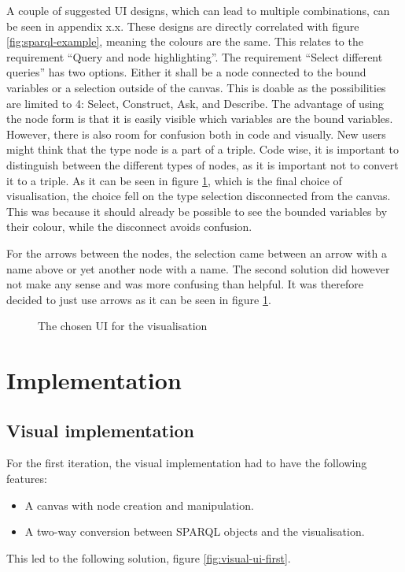 \bigskip
A couple of suggested UI designs, which can lead to multiple combinations, can be seen in appendix {\color{red}x.x}. These designs are directly correlated with figure \ref{fig:sparql-example}, meaning the colours are the same. This relates to the requirement “Query and node highlighting”. The requirement “Select different queries” has two options. Either it shall be a node connected to the bound variables or a selection outside of the canvas. This is doable as the possibilities are limited to 4: Select, Construct, Ask, and Describe. The advantage of using the node form is that it is easily visible which variables are the bound variables. However, there is also room for confusion both in code and visually. New users might think that the type node is a part of a triple. Code wise, it is important to distinguish between the different types of nodes, as it is important not to convert it to a triple. As it can be seen in figure \ref{fig:chosen-ui}, which is the final choice of visualisation, the choice fell on the type selection disconnected from the canvas. This was because it should already be possible to see the bounded variables by their colour, while the disconnect avoids confusion.

For the arrows between the nodes, the selection came between an arrow with a name above or yet another node with a name. The second solution did however not make any sense and was more confusing than helpful. It was therefore decided to just use arrows as it can be seen in figure \ref{fig:chosen-ui}.

\begin{figure}[H]
    \centering
    
    \caption{The chosen UI for the visualisation}
    \label{fig:chosen-ui}
\end{figure}


\section{Implementation}
\subsection{Visual implementation}
For the first iteration, the visual implementation had to have the following features:
\begin{itemize}
    \item A canvas with node creation and manipulation.
    \item A two-way conversion between SPARQL objects and the visualisation.
\end{itemize}
This led to the following solution, figure \ref{fig:visual-ui-first}.

